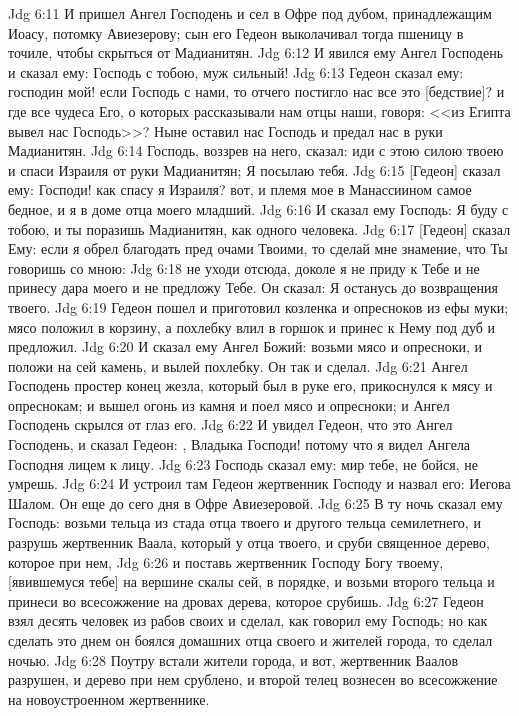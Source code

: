\vs Jdg 6:11 И пришел Ангел Господень и сел в Офре под дубом, принадлежащим Иоасу, потомку Авиезерову; сын его Гедеон выколачивал тогда пшеницу в точиле, чтобы скрыться от Мадианитян.
\vs Jdg 6:12 И явился ему Ангел Господень и сказал ему: Господь с тобою, муж сильный!
\vs Jdg 6:13 Гедеон сказал ему: господин мой! если Господь с нами, то отчего постигло нас все это [бедствие]? и где все чудеса Его, о которых рассказывали нам отцы наши, говоря: <<из Египта вывел нас Господь>>? Ныне оставил нас Господь и предал нас в руки Мадианитян.
\vs Jdg 6:14 Господь, воззрев на него, сказал: иди с этою силою твоею и спаси Израиля от руки Мадианитян; Я посылаю тебя.
\vs Jdg 6:15 [Гедеон] сказал ему: Господи! как спасу я Израиля? вот, и племя мое в  Манассиином самое бедное, и я в доме отца моего младший.
\vs Jdg 6:16 И сказал ему Господь: Я буду с тобою, и ты поразишь Мадианитян, как одного человека.
\vs Jdg 6:17 [Гедеон] сказал Ему: если я обрел благодать пред очами Твоими, то сделай мне знамение, что Ты говоришь со мною:
\vs Jdg 6:18 не уходи отсюда, доколе я не приду к Тебе и не принесу дара моего и не предложу Тебе. Он сказал: Я останусь до возвращения твоего.
\vs Jdg 6:19 Гедеон пошел и приготовил козленка и опресноков из ефы муки; мясо положил в корзину, а похлебку влил в горшок и принес к Нему под дуб и предложил.
\vs Jdg 6:20 И сказал ему Ангел Божий: возьми мясо и опресноки, и положи на сей камень, и вылей похлебку. Он так и сделал.
\vs Jdg 6:21 Ангел Господень простер конец жезла, который был в руке его, прикоснулся к мясу и опреснокам; и вышел огонь из камня и поел мясо и опресноки; и Ангел Господень скрылся от глаз его.
\vs Jdg 6:22 И увидел Гедеон, что это Ангел Господень, и сказал Гедеон: , Владыка Господи! потому что я видел Ангела Господня лицем к лицу.
\vs Jdg 6:23 Господь сказал ему: мир тебе, не бойся, не умрешь.
\vs Jdg 6:24 И устроил там Гедеон жертвенник Господу и назвал его: Иегова Шалом. Он еще до сего дня в Офре Авиезеровой.
\vs Jdg 6:25 В ту ночь сказал ему Господь: возьми тельца из стада отца твоего и другого тельца семилетнего, и разрушь жертвенник Ваала, который у отца твоего, и сруби священное дерево, которое при нем,
\vs Jdg 6:26 и поставь жертвенник Господу Богу твоему, [явившемуся тебе] на вершине скалы сей, в порядке, и возьми второго тельца и принеси во всесожжение на дровах дерева, которое срубишь.
\vs Jdg 6:27 Гедеон взял десять человек из рабов своих и сделал, как говорил ему Господь; но как сделать это днем он боялся домашних отца своего и жителей города, то сделал ночью.
\vs Jdg 6:28 Поутру встали жители города, и вот, жертвенник Ваалов разрушен, и дерево при нем срублено, и второй телец вознесен во всесожжение на новоустроенном жертвеннике.
